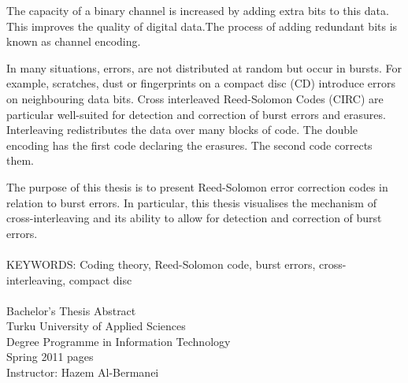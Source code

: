 \documentclass[../main.tex]{subfiles}
\begin{document}
The capacity of a binary channel is increased by adding extra bits to this data. This improves the quality of digital data.The process of adding redundant bits is known as channel encoding.

In many situations, errors, are not distributed at random but occur in bursts. For example, scratches, dust or fingerprints on a compact disc (CD) introduce errors on neighbouring data bits. Cross interleaved Reed-Solomon Codes (CIRC) are particular well-suited for detection and correction of burst errors and erasures. Interleaving redistributes the data over many blocks of code. The double encoding has the first code declaring the erasures. The second code corrects them.

The purpose of this thesis is to present Reed-Solomon error correction codes in relation to burst errors. In particular, this thesis visualises the mechanism of cross-interleaving and its ability to allow for detection and correction of burst errors.

\paragraph{}
KEYWORDS: Coding theory, Reed-Solomon code, burst errors, cross-inter\-leaving, compact disc

\paragraph{}
Bachelor's Thesis \textbar\space Abstract \\
Turku University of Applied Sciences \\
Degree Programme in Information Technology \\
Spring 2011 \textbar\space \pageref{LastPage} pages \\
Instructor: Hazem Al-Bermanei \\
\end{document}
